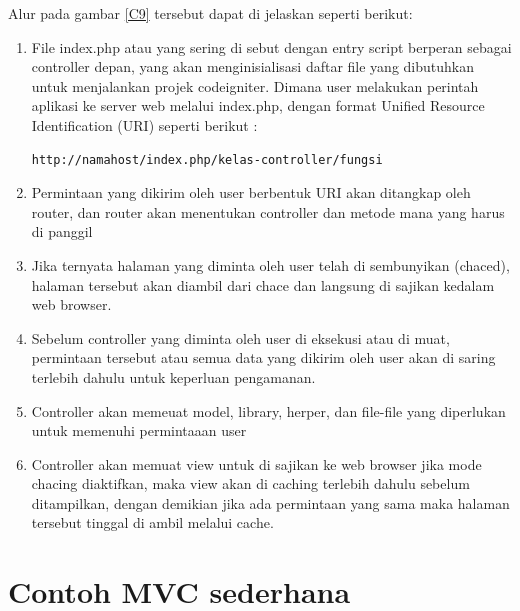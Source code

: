 Alur pada gambar \ref{C9} tersebut dapat di jelaskan seperti berikut:
\begin{enumerate}
\item File index.php atau yang sering di sebut dengan entry script berperan sebagai controller depan, yang akan menginisialisasi daftar file yang dibutuhkan untuk menjalankan projek codeigniter. Dimana user melakukan perintah aplikasi ke server web melalui index.php, dengan format Unified Resource Identification (URI) seperti berikut :
\begin{verbatim}http://namahost/index.php/kelas-controller/fungsi  \end{verbatim} 
\item Permintaan yang dikirim oleh user berbentuk URI akan ditangkap oleh router, dan router akan menentukan controller dan metode mana yang harus di panggil
\item Jika ternyata halaman yang diminta oleh user telah di sembunyikan (chaced), halaman tersebut akan diambil dari chace dan langsung di sajikan kedalam web browser.
\item Sebelum controller yang diminta oleh user di eksekusi atau di muat, permintaan tersebut atau semua data yang dikirim oleh user akan di saring terlebih dahulu untuk keperluan pengamanan.
\item Controller akan memeuat model, library, herper, dan file-file yang diperlukan untuk memenuhi permintaaan user
\item Controller akan memuat view untuk di sajikan ke web browser jika mode chacing diaktifkan, maka view akan di caching terlebih dahulu sebelum ditampilkan, dengan demikian jika ada permintaan yang sama maka halaman tersebut tinggal di ambil melalui cache.
\end{enumerate}


\section{ Contoh MVC sederhana}


